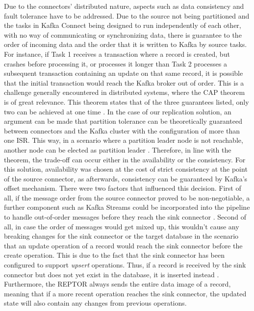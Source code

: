 Due to the connectors' distributed nature, aspects such as data consistency and fault tolerance have to be addressed. Due to the source not being partitioned and the tasks in Kafka Connect being designed to run independently of each other, with no way of communicating or synchronizing data, there is guarantee to the order of incoming data and the order that it is written to Kafka by source tasks. For instance, if Task 1 receives a transaction where a record is created, but crashes before processing it, or processes it longer than Task 2 processes a subsequent transaction containing an update on that same record, it is possible that the initial transaction would reach the Kafka broker out of order. This is a challenge generally encountered in distributed systems, where the \ac{CAP} theorem is of great relevance. This theorem states that of the three guarantees listed, only two can be achieved at one time \cite{nookala2022distributedshift}. In the case of our replication solution, an argument can be made that partition tolerance can be theoretically guaranteed between connectors and the Kafka cluster with the configuration of more than one \ac{ISR}. This way, in a scenario where a partition leader node is not reachable, another node can be elected as partition leader \cite{optimizingkafkacap}. Therefore, in line with the theorem, the trade-off can occur either in the availability or the consistency. For this solution, availability was chosen at the cost of strict consistency at the point of the source connector, as afterwards, consistency can be guaranteed by Kafka's offset mechanism. There were two factors that influenced this decision. First of all, if the message order from the source connector proved to be non-negotiable, a further component such as Kafka Streams could be incorporated into the pipeline to handle out-of-order messages before they reach the sink connector \cite{wang2021consistency}. Second of all, in case the order of messages would get mixed up, this wouldn't cause any breaking changes for the sink connector or the target database in the scenario that an update operation of a record would reach the sink connector before the create operation. This is due to the fact that the sink connector has been configured to support \textit{upsert} operations. Thus, if a record is received by the sink connector but does not yet exist in the database, it is inserted instead \cite{jdbcsinkdocumentation}. Furthermore, the \ac{REPTOR} always sends the entire data image of a record, meaning that if a more recent operation reaches the sink connector, the updated state will also contain any changes from previous operations.


